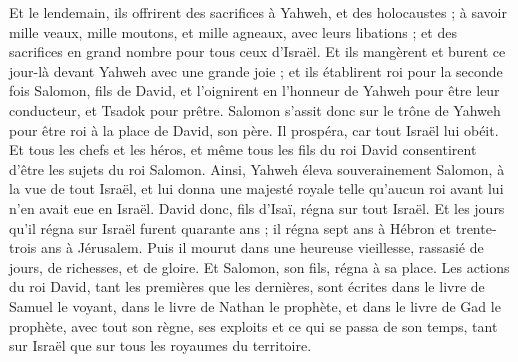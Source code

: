 \begin{multicols}{2}
Et le lendemain, ils offrirent des sacrifices à Yahweh, et des holocaustes ; à savoir mille veaux, mille moutons, et mille agneaux, avec leurs libations ; et des sacrifices en grand nombre pour tous ceux d'Israël.
Et ils mangèrent et burent ce jour-là devant Yahweh avec une grande joie ; et ils établirent roi pour la seconde fois Salomon, fils de David, et l'oignirent en l'honneur de Yahweh pour être leur conducteur, et Tsadok pour prêtre.
Salomon s'assit donc sur le trône de Yahweh pour être roi à la place de David, son père. Il prospéra, car tout Israël lui obéit.
Et tous les chefs et les héros, et même tous les fils du roi David consentirent d'être les sujets du roi Salomon.
Ainsi, Yahweh éleva souverainement Salomon, à la vue de tout Israël, et lui donna une majesté royale telle qu'aucun roi avant lui n'en avait eue en Israël.
David donc, fils d'Isaï, régna sur tout Israël.
Et les jours qu'il régna sur Israël furent quarante ans ; il régna sept ans à Hébron et trente-trois ans à Jérusalem.
Puis il mourut dans une heureuse vieillesse, rassasié de jours, de richesses, et de gloire. Et Salomon, son fils, régna à sa place.
Les actions du roi David, tant les premières que les dernières, sont écrites dans le livre de Samuel le voyant, dans le livre de Nathan le prophète, et dans le livre de Gad le prophète,
avec tout son règne, ses exploits et ce qui se passa de son temps, tant sur Israël que sur tous les royaumes du territoire.
\PPE{}
\end{multicols}
